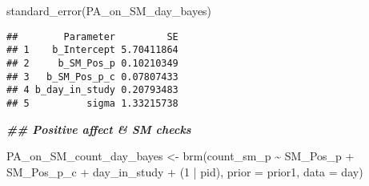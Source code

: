 \documentclass[
]{article}
\newenvironment{Shaded}{\begin{snugshade}}{\end{snugshade}}
\newcommand{\AttributeTok}[1]{\textcolor[rgb]{0.77,0.63,0.00}{#1}}
\newcommand{\DecValTok}[1]{\textcolor[rgb]{0.00,0.00,0.81}{#1}}
\newcommand{\DocumentationTok}[1]{\textcolor[rgb]{0.56,0.35,0.01}{\textbf{\textit{#1}}}}
\newcommand{\FunctionTok}[1]{\textcolor[rgb]{0.00,0.00,0.00}{#1}}
\newcommand{\NormalTok}[1]{#1}
\newcommand{\OtherTok}[1]{\textcolor[rgb]{0.56,0.35,0.01}{#1}}
\newcommand{\SpecialCharTok}[1]{\textcolor[rgb]{0.00,0.00,0.00}{#1}}
\begin{document}
\begin{Shaded}
\begin{Highlighting}[]
\FunctionTok{standard\_error}\NormalTok{(PA\_on\_SM\_day\_bayes)}
\end{Highlighting}
\end{Shaded}

\begin{verbatim}
##        Parameter         SE
## 1    b_Intercept 5.70411864
## 2     b_SM_Pos_p 0.10210349
## 3   b_SM_Pos_p_c 0.07807433
## 4 b_day_in_study 0.20793483
## 5          sigma 1.33215738
\end{verbatim}

\begin{Shaded}
\begin{Highlighting}[]
\DocumentationTok{\#\# Positive affect \& SM checks}

\NormalTok{PA\_on\_SM\_count\_day\_bayes  }\OtherTok{\textless{}{-}} \FunctionTok{brm}\NormalTok{(count\_sm\_p }\SpecialCharTok{\textasciitilde{}}\NormalTok{ SM\_Pos\_p }\SpecialCharTok{+}\NormalTok{ SM\_Pos\_p\_c }\SpecialCharTok{+}\NormalTok{ day\_in\_study }\SpecialCharTok{+}\NormalTok{ (}\DecValTok{1} \SpecialCharTok{|}\NormalTok{ pid), }\AttributeTok{prior =}\NormalTok{ prior1, }\AttributeTok{data =}\NormalTok{ day)}
\end{Highlighting}
\end{Shaded}
\end{document}
